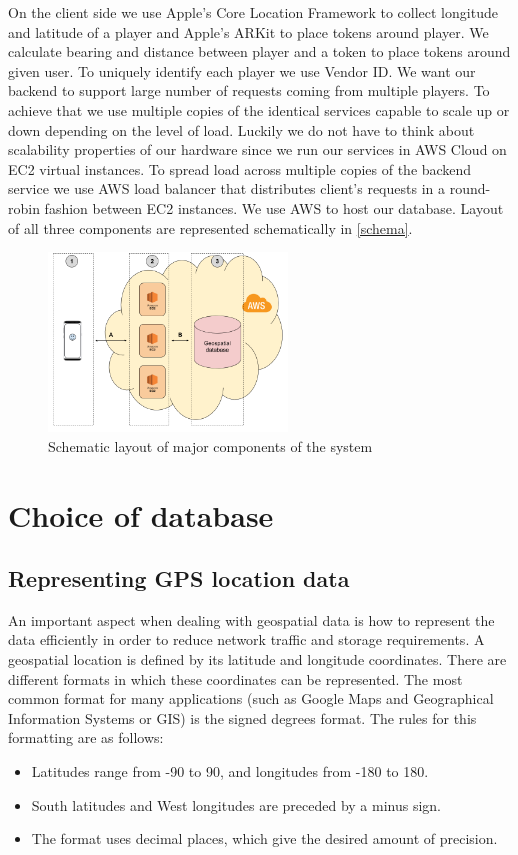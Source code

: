 \documentclass[conference]{IEEEtran}
\begin{document}
On the client side we use Apple’s Core Location Framework to collect longitude and latitude of a player and Apple’s ARKit to place tokens around player. We calculate bearing and distance between player and a token to place tokens around given user. To uniquely identify each player we use Vendor ID.
We want our backend to support large number of requests coming from multiple players. To achieve that we use multiple copies of the identical services capable to scale up or down depending on the level of load. Luckily we do not have to think about scalability properties of our hardware since we run our services in AWS Cloud on EC2 virtual instances.  To spread load across multiple copies of the backend service we use AWS load balancer that distributes client’s requests in a round-robin fashion between EC2 instances. 
We use AWS to host our database. 
Layout of all three components are represented schematically in \autoref{schema}. 

\begin{figure}
\centering
\includegraphics[width=2.5in]{imgs/systemschema.png}
\caption{Schematic layout of major components of the system}
\label{schema}
\end{figure}

\section{Choice of database}
\subsection{Representing GPS location data}

An important aspect when dealing with geospatial data is how to represent the data efficiently in order to reduce network traffic and storage requirements. A geospatial location is defined by its latitude and longitude coordinates. There are different formats in which these coordinates can be represented. The most common format for many applications (such as Google Maps and Geographical Information Systems or GIS) is the signed degrees format. The rules for this formatting are as follows:
\begin{itemize}
\item Latitudes range from -90 to 90, and longitudes from -180 to 180. 
\item South latitudes and West longitudes are preceded by a minus sign.
\item The format uses decimal places, which give the desired amount of precision. 
\end{itemize}
\end{document}
